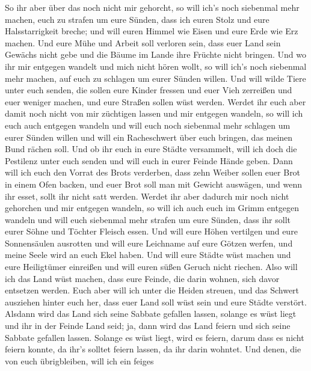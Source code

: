 So ihr aber über das noch nicht mir gehorcht, so will ich's noch
siebenmal mehr machen, euch zu strafen um eure Sünden, 
dass ich euren Stolz und eure Halsstarrigkeit breche; und will euren
Himmel wie Eisen und eure Erde wie Erz machen.  Und eure
Mühe und Arbeit soll verloren sein, dass euer Land sein Gewächs nicht
gebe und die Bäume im Lande ihre Früchte nicht bringen. 
Und wo ihr mir entgegen wandelt und mich nicht hören wollt, so will
ich's noch siebenmal mehr machen, auf euch zu schlagen um eurer Sünden
willen.  Und will wilde Tiere unter euch senden, die sollen
eure Kinder fressen und euer Vieh zerreißen und euer weniger machen, und
eure Straßen sollen wüst werden.  Werdet ihr euch aber
damit noch nicht von mir züchtigen lassen und mir entgegen wandeln,
 so will ich euch auch entgegen wandeln und will euch noch
siebenmal mehr schlagen um eurer Sünden willen  und will
ein Racheschwert über euch bringen, das meinen Bund rächen soll. Und ob
ihr euch in eure Städte versammelt, will ich doch die Pestilenz unter
euch senden und will euch in eurer Feinde Hände geben. 
Dann will ich euch den Vorrat des Brots verderben, dass zehn Weiber
sollen euer Brot in einem Ofen backen, und euer Brot soll man mit
Gewicht auswägen, und wenn ihr esset, sollt ihr nicht satt werden.
 Werdet ihr aber dadurch mir noch nicht gehorchen und mir
entgegen wandeln,  so will ich auch euch im Grimm entgegen
wandeln und will euch siebenmal mehr strafen um eure Sünden,
 dass ihr sollt eurer Söhne und Töchter Fleisch essen.
 Und will eure Höhen vertilgen und eure Sonnensäulen
ausrotten und will eure Leichname auf eure Götzen werfen, und meine
Seele wird an euch Ekel haben.  Und will eure Städte wüst
machen und eure Heiligtümer einreißen und will euren süßen Geruch nicht
riechen.  Also will ich das Land wüst machen, dass eure
Feinde, die darin wohnen, sich davor entsetzen werden. 
Euch aber will ich unter die Heiden streuen, und das Schwert ausziehen
hinter euch her, dass euer Land soll wüst sein und eure Städte verstört.
 Alsdann wird das Land sich seine Sabbate gefallen lassen,
solange es wüst liegt und ihr in der Feinde Land seid; ja, dann wird das
Land feiern und sich seine Sabbate gefallen lassen. 
Solange es wüst liegt, wird es feiern, darum dass es nicht feiern
konnte, da ihr's solltet feiern lassen, da ihr darin wohntet.
 Und denen, die von euch übrigbleiben, will ich ein feiges
